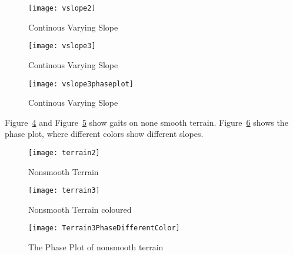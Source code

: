 \begin{figure}[!htbp]
  \begin{center}
      \texttt{[image: vslope2]}
    \caption{Continous Varying Slope}
    \label{fig:vp1}
\end{center}
\end{figure}


\begin{figure}[!htbp]
  \begin{center}
      \texttt{[image: vslope3]}
    \caption{Continous Varying Slope}
    \label{fig:vp2}
\end{center}
\end{figure}


\begin{figure}[!htbp]
  \begin{center}
      \texttt{[image: vslope3phaseplot]}
    \caption{Continous Varying Slope}
    \label{fig:vp2phas}
\end{center}
\end{figure}



Figure~\ref{fig:nonsmoothterrain1} and Figure~\ref{fig:nonsmootterrain2} show gaits on none smooth terrain.
Figure~\ref{fig:diffterrain2} shows the phase plot, where different colors show different slopes.
\begin{figure}[!htbp]
  \begin{center}
      \texttt{[image: terrain2]}
    \caption{Nonsmooth Terrain }
    \label{fig:nonsmoothterrain1}
\end{center}
\end{figure}

\begin{figure}[!htbp]
  \begin{center}
      \texttt{[image: terrain3]}
    \caption{Nonsmooth Terrain coloured}
    \label{fig:nonsmootterrain2}
\end{center}
\end{figure}


\begin{figure}[!htbp]
  \begin{center}
    \texttt{[image: Terrain3PhaseDifferentColor]}
    \caption{The Phase Plot of nonsmooth terrain}
    \label{fig:diffterrain2}
\end{center}
\end{figure}






